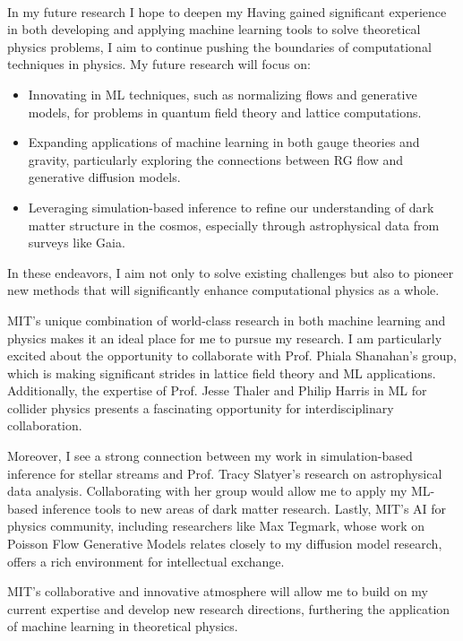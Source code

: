 \documentclass[11pt]{article}
\begin{document}
\paragraph{\color{royalblue}{Research Plans.}}
In my future research I hope to deepen my
Having gained significant experience in both developing and applying machine learning tools to solve theoretical physics problems, I aim to continue pushing the boundaries of computational techniques in physics. My future research will focus on:
\begin{itemize}
    \item Innovating in ML techniques, such as normalizing flows and generative models, for problems in quantum field theory and lattice computations.
    \item Expanding applications of machine learning in both gauge theories and gravity, particularly exploring the connections between RG flow and generative diffusion models.
    \item Leveraging simulation-based inference to refine our understanding of dark matter structure in the cosmos, especially through astrophysical data from surveys like Gaia.
\end{itemize}

In these endeavors, I aim not only to solve existing challenges but also to pioneer new methods that will significantly enhance computational physics as a whole.


MIT’s unique combination of world-class research in both machine learning and physics makes it an ideal place for me to pursue my research. I am particularly excited about the opportunity to collaborate with Prof. Phiala Shanahan’s group, which is making significant strides in lattice field theory and ML applications. Additionally, the expertise of Prof. Jesse Thaler and Philip Harris in ML for collider physics presents a fascinating opportunity for interdisciplinary collaboration.

Moreover, I see a strong connection between my work in simulation-based inference for stellar streams and Prof. Tracy Slatyer’s research on astrophysical data analysis. Collaborating with her group would allow me to apply my ML-based inference tools to new areas of dark matter research. Lastly, MIT’s AI for physics community, including researchers like Max Tegmark, whose work on Poisson Flow Generative Models relates closely to my diffusion model research, offers a rich environment for intellectual exchange.

MIT’s collaborative and innovative atmosphere will allow me to build on my current expertise and develop new research directions, furthering the application of machine learning in theoretical physics.



\end{document}
